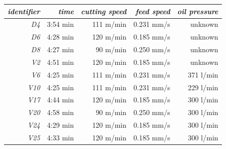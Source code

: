 \documentclass[12 pt]{scrartcl}
\begin{document}
\begin{table}[ht]
  \centering
  \label{tab:parameters}
  \begin{tabular}{r|rrrr}
    \emph{identifier} & \emph{time} & \emph{cutting speed} & \emph{feed speed} & \emph{oil pressure} \\
    \hline
    \emph{D4}         & 3:54 min    & 111 m/min            & 0.231 mm/s        & unknown             \\
    \emph{D6}         & 4:28 min    & 120 m/min            & 0.185 mm/s        & unknown             \\
    \emph{D8}         & 4:27 min    & 90 m/min             & 0.250 mm/s        & unknown             \\
    \emph{V2}         & 4:51 min    & 120 m/min            & 0.185 mm/s        & unknown             \\
    \emph{V6}         & 4:25 min    & 111 m/min            & 0.231 mm/s        & 371 l/min           \\
    \emph{V10}        & 4:25 min    & 111 m/min            & 0.231 mm/s        & 229 l/min           \\
    \emph{V17}        & 4:44 min    & 120 m/min            & 0.185 mm/s        & 300 l/min           \\
    \emph{V20}        & 4:58 min    & 90 m/min             & 0.250 mm/s        & 300 l/min           \\
    \emph{V24}        & 4:29 min    & 120 m/min            & 0.185 mm/s        & 300 l/min           \\
    \emph{V25}        & 4:33 min    & 120 m/min            & 0.185 mm/s        & 300 l/min           \\
  \end{tabular}
\end{table}
\end{document}
